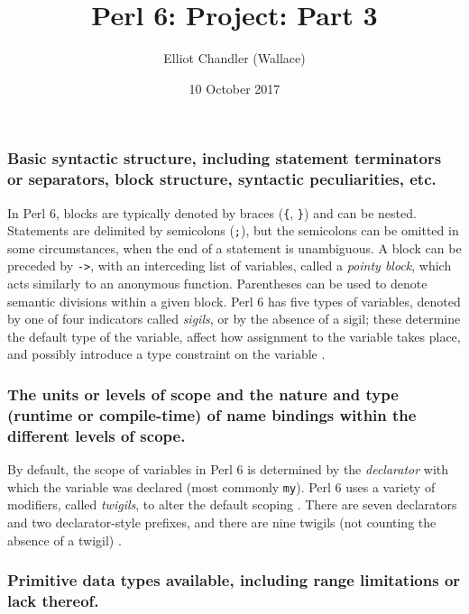 \documentclass[17pt,english]{extarticle}
\begin{document}
\title{Perl 6: Project: Part 3}


\author{Elliot Chandler (Wallace)}


\date{10 October 2017}

\maketitle

\subsubsection*{Basic syntactic structure, including statement terminators or separators,
block structure, syntactic peculiarities, etc.}

In Perl 6, blocks are typically denoted by braces (\texttt{\{}, \texttt{\}})
and can be nested. Statements are delimited by semicolons (\texttt{;}),
but the semicolons can be omitted in some circumstances, when the
end of a statement is unambiguous. A block can be preceded by \texttt{-‌>},
with an interceding list of variables, called a \emph{pointy block},
which acts similarly to an anonymous function. Parentheses can be
used to denote semantic divisions within a given block. Perl 6 has
five types of variables, denoted by one of four indicators called
\emph{sigils}, or by the absence of a sigil; these determine the default
type of the variable, affect how assignment to the variable takes
place, and possibly introduce a type constraint on the variable \citep{Documentation}.


\subsubsection*{The units or levels of scope and the nature and type (runtime or
compile-time) of name bindings within the different levels of scope.}

By default, the scope of variables in Perl 6 is determined by the
\emph{declarator} with which the variable was declared (most commonly
\texttt{my}). Perl 6 uses a variety of modifiers, called \emph{twigils},
to alter the default scoping \citep{Documentation}. There are seven
declarators and two declarator-style prefixes, and there are nine
twigils (not counting the absence of a twigil) \citep{Documentation}. 


\subsubsection*{Primitive data types available, including range limitations or lack
thereof.}
\end{document}

